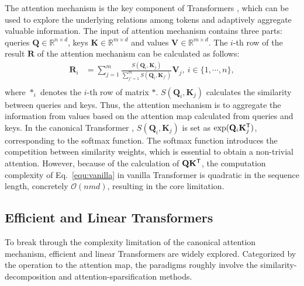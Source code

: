 \documentclass[nohyperref]{article}
\theoremstyle{plain}
\theoremstyle{definition}
\theoremstyle{remark}
\begin{document}
The attention mechanism is the key component of Transformers \citep{NIPS2017_3f5ee243}, which can be used to explore the underlying relations among tokens and adaptively aggregate valuable information. The input of attention mechanism contains three parts: queries $\mathbf{Q}\in\mathbb{R}^{n\times d}$, keys $\mathbf{K}\in\mathbb{R}^{m\times d}$ and values $\mathbf{V}\in\mathbb{R}^{m\times d}$. The $i$-th row of the result  $\mathbf{R}$ of the attention mechanism can be calculated as follows:
\begin{equation}\label{equ:vanilla}
	\begin{split}
		\mathbf{R}_{i}&=\sum_{j=1}^{m}\frac{S(\mathbf{Q}_{i},\mathbf{K}_{j})}{\sum_{j'=1}^{m}S(\mathbf{Q}_{i},\mathbf{K}_{j'})}\mathbf{V}_{j},\ i\in\{1,\cdots,n\},\\
	\end{split}
\end{equation}
where ${\ast}_{i}$ denotes the $i$-th row of matrix $\ast$. $S(\mathbf{Q}_{i},\mathbf{K}_{j})$ calculates the similarity between queries and keys. Thus, the attention mechanism is to aggregate the information from values based on the attention map calculated from queries and keys. In the canonical Transformer \cite{NIPS2017_3f5ee243}, $S(\mathbf{Q}_{i},\mathbf{K}_{j})$ is set as $\text{exp}(\mathbf{Q}_{i}\mathbf{K}_{j}^{\sf T})$, corresponding to the softmax function. The softmax function introduces the competition between similarity weights, which is essential to obtain a non-trivial attention. However, because of the calculation of $\mathbf{Q}\mathbf{K}^{\sf T}$, the computation complexity of Eq.~\eqref{equ:vanilla} in vanilla Transformer is quadratic in the sequence length, concretely $\mathcal{O}(nmd)$, resulting in the core limitation.

\vspace{-5pt}
\subsection{Efficient and Linear Transformers}

To break through the complexity limitation of the canonical attention mechanism, efficient and linear Transformers are widely explored. Categorized by the operation to the attention map, the paradigms roughly involve the similarity-decomposition and attention-sparsification methods.

\vspace{-5pt}
\end{document}
